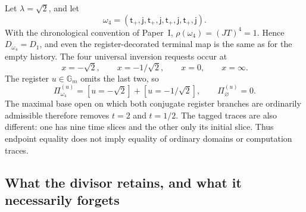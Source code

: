 \begin{example}
\label{ex:omega-four-register-trace}
Let \(\lambda=\sqrt2\), and let
\[
 \omega_4=(\mathsf t_+,\mathsf j,
            \mathsf t_+,\mathsf j,
            \mathsf t_+,\mathsf j,
            \mathsf t_+,\mathsf j).
\]
With the chronological convention of Paper~I,
\(\rho(\omega_4)=(JT)^4=1\).  Hence \(D_{\omega_4}=D_1\), and even the
register-decorated terminal map is the same as for the empty history.  The four
universal inversion requests occur at
\[
 x=-\sqrt2,\qquad x=-1/\sqrt2,\qquad x=0,\qquad x=\infty.
\]
The register \(u\in\mathbb G_m\) omits the last two, so
\begin{equation}
 \Pi_{\omega_4}^{(u)}=[u=-\sqrt2]+[u=-1/\sqrt2],
 \qquad
 \Pi_{\varnothing}^{(u)}=0.
 \label{eq:omega-four-register-poles}
\end{equation}
The maximal base open on which both conjugate register branches are ordinarily
admissible therefore removes \(t=2\) and \(t=1/2\).  The tagged traces are also
different: one has nine time slices and the other only its initial slice.  Thus
endpoint equality does not imply equality of ordinary domains or computation
traces.
\end{example}

\subsection{What the divisor retains, and what it necessarily forgets}
\label{subsec:register-divisor-kernels}

